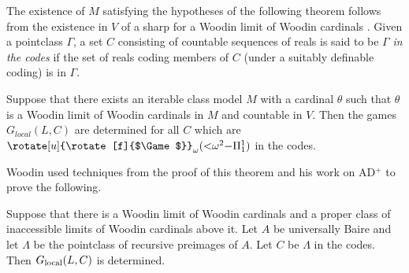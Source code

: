 \documentclass{book}%
\newcommand{\game}{\rotate[u]{\rotate[f]{$\Game$}}}
\newcommand{\less}{\mathord{<}}
\newcommand{\thing}{\mathord{-}}
\newcommand{\cut}{\mathord{||}}
\begin{document}

The existence of $M$ satisfying the hypotheses of the following
theorem follows from the existence in $V$ of a sharp for a Woodin
limit of Woodin cardinals \cite{Neeman:2002}. Given a pointclass $\Gamma$, a
set $C$ consisting of countable sequences of reals is said to be $\Gamma$ \emph{in the codes}
if the set of reals coding members of $C$ (under a suitably definable coding) is in $\Gamma$.

\begin{theorem}\label{7E1} Suppose that there exists
an iterable class model $M$ with a cardinal $\theta$ such that
$\theta$ is a Woodin limit of Woodin cardinals in $M$ and countable
in $V$. Then the games $G_{local}(L,C)$ are determined for all $C$
which are $\game_{\omega}(\less\omega^{2}\thing\Pi^{1}_{1})$ in the
codes.
\end{theorem}

Woodin used techniques from the proof of this theorem and his work on
AD$^{+}$ to prove the following.

\begin{theorem} Suppose that there is a Woodin limit of
Woodin cardinals and a proper class of inaccessible limits of Woodin
cardinals above it. Let $A$ be universally Baire and let $\Lambda$
be the pointclass of recursive preimages of $A$. Let $C$ be
$\Lambda$ in the codes. Then $G_{\rm local}(L, C)$ is
determined.
\end{theorem}
\end{document}
